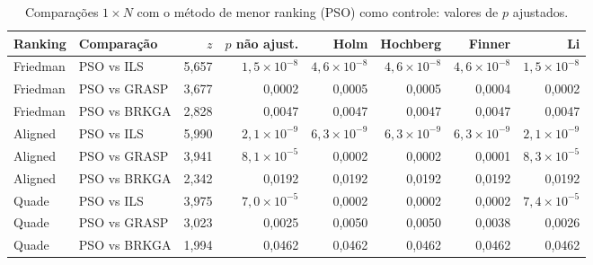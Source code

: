 \begin{table}[t]
\centering
\caption{Comparações $1\times N$ com o método de menor ranking (PSO) como controle: valores de $p$ ajustados.}
\label{tab:posthoc1xn}
\footnotesize
\begin{tabular}{@{}llrrrrrr@{}}
\toprule
Ranking & Comparação & $z$ & $p$ não ajust. & Holm & Hochberg & Finner & Li \\
\midrule
Friedman & PSO vs ILS & 5,657 & $1,5\times10^{-8}$ & $4,6\times10^{-8}$ & $4,6\times10^{-8}$ & $4,6\times10^{-8}$ & $1,5\times10^{-8}$ \\
Friedman & PSO vs GRASP & 3,677 & 0,0002 & 0,0005 & 0,0005 & 0,0004 & 0,0002 \\
Friedman & PSO vs BRKGA & 2,828 & 0,0047 & 0,0047 & 0,0047 & 0,0047 & 0,0047 \\
Aligned & PSO vs ILS & 5,990 & $2,1\times10^{-9}$ & $6,3\times10^{-9}$ & $6,3\times10^{-9}$ & $6,3\times10^{-9}$ & $2,1\times10^{-9}$ \\
Aligned & PSO vs GRASP & 3,941 & $8,1\times10^{-5}$ & 0,0002 & 0,0002 & 0,0001 & $8,3\times10^{-5}$ \\
Aligned & PSO vs BRKGA & 2,342 & 0,0192 & 0,0192 & 0,0192 & 0,0192 & 0,0192 \\
Quade & PSO vs ILS & 3,975 & $7,0\times10^{-5}$ & 0,0002 & 0,0002 & 0,0002 & $7,4\times10^{-5}$ \\
Quade & PSO vs GRASP & 3,023 & 0,0025 & 0,0050 & 0,0050 & 0,0038 & 0,0026 \\
Quade & PSO vs BRKGA & 1,994 & 0,0462 & 0,0462 & 0,0462 & 0,0462 & 0,0462 \\
\bottomrule
\end{tabular}
\end{table}
